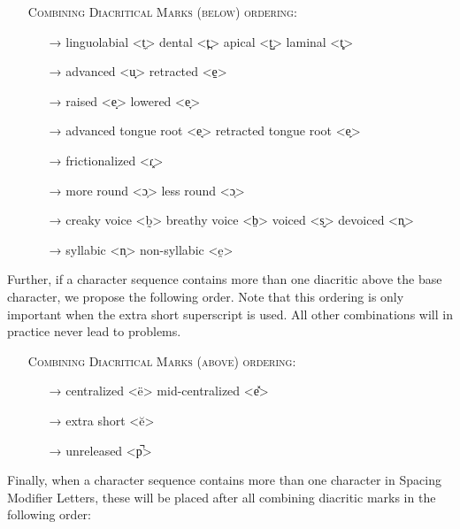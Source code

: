 \begin{itemize}
	\item[] \textsc{Combining Diacritical Marks (below) ordering:}
	\begin{itemize}	
	  \item[→] linguolabial <t̼> \textbar{} dental <t̪> \textbar{} apical <t̺> \textbar{} laminal <t̻>
	  \item[→] advanced <u̟> \textbar{} retracted <e̠> 
	  \item[→] raised <e̝> \textbar{} lowered <e̞>
	  \item[→] advanced tongue root <e̘> \textbar{} retracted tongue root <e̙>
	  \item[→] frictionalized <ɾ͓>
	  \item[→] more round <ɔ̹> \textbar{} less round <ɔ̜>
	  \item[→] creaky voice <b̰> \textbar{} breathy voice <b̤> \textbar{} voiced <s̬> \textbar{} devoiced <n̥>
	  \item[→] syllabic <n̩> \textbar{} non-syllabic <e̯>
	\end{itemize}
 \end{itemize}

Further, if a character sequence contains more than one diacritic above the base
character, we propose the following order. Note that this ordering is only
important when the extra short superscript is used. All other combinations will 
in practice never lead to problems.

\begin{itemize}
	\item[] \textsc{Combining Diacritical Marks (above) ordering:}
	\begin{itemize}
	  \item[→] centralized <ë> \textbar{} mid-centralized <e̽>
	  \item[→] extra short <ĕ>
	  \item[→] unreleased <p̚>
 \end{itemize} \end{itemize}

Finally, when a character sequence contains more than one character in Spacing
Modifier Letters, these will be placed after all combining diacritic marks in the
following order:

